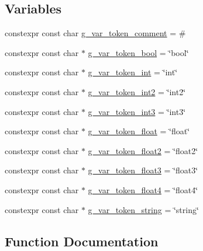 \subsection*{Variables}
\begin{DoxyCompactItemize}
\item 
constexpr const char \hyperlink{namespacemage_1_1loader_a51fd34b486dfe1d203f7c7b897b2fd2c}{g\+\_\+var\+\_\+token\+\_\+comment} = \textquotesingle{}\#\textquotesingle{}
\item 
constexpr const char $\ast$ \hyperlink{namespacemage_1_1loader_af8ee37ed91ac28f044c159272c402c8f}{g\+\_\+var\+\_\+token\+\_\+bool} = \char`\"{}bool\char`\"{}
\item 
constexpr const char $\ast$ \hyperlink{namespacemage_1_1loader_a37db62978f9ca6fb022c2668ee544842}{g\+\_\+var\+\_\+token\+\_\+int} = \char`\"{}int\char`\"{}
\item 
constexpr const char $\ast$ \hyperlink{namespacemage_1_1loader_a6ef08c6dd9504fbbdb2b151decc0e93f}{g\+\_\+var\+\_\+token\+\_\+int2} = \char`\"{}int2\char`\"{}
\item 
constexpr const char $\ast$ \hyperlink{namespacemage_1_1loader_a4d46ae8b522ffdf597cbfef8ff300f36}{g\+\_\+var\+\_\+token\+\_\+int3} = \char`\"{}int3\char`\"{}
\item 
constexpr const char $\ast$ \hyperlink{namespacemage_1_1loader_a3732f74f1d4aec47eb9957a310d59acf}{g\+\_\+var\+\_\+token\+\_\+float} = \char`\"{}float\char`\"{}
\item 
constexpr const char $\ast$ \hyperlink{namespacemage_1_1loader_ac1ec2d32ca513327528e23ffebb92be0}{g\+\_\+var\+\_\+token\+\_\+float2} = \char`\"{}float2\char`\"{}
\item 
constexpr const char $\ast$ \hyperlink{namespacemage_1_1loader_a70b076251ea234128736d1a8c6761d4c}{g\+\_\+var\+\_\+token\+\_\+float3} = \char`\"{}float3\char`\"{}
\item 
constexpr const char $\ast$ \hyperlink{namespacemage_1_1loader_aaf283d156cc079b16c1b5821c2078c78}{g\+\_\+var\+\_\+token\+\_\+float4} = \char`\"{}float4\char`\"{}
\item 
constexpr const char $\ast$ \hyperlink{namespacemage_1_1loader_adec72619d7286e73229e6f1049cc7195}{g\+\_\+var\+\_\+token\+\_\+string} = \char`\"{}string\char`\"{}
\end{DoxyCompactItemize}


\subsection{Function Documentation}
\hypertarget{namespacemage_1_1loader_a1d82435c3f70b2a58351652947c309b2}{}\label{namespacemage_1_1loader_a1d82435c3f70b2a58351652947c309b2} 
